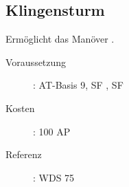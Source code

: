 \subsection{Klingensturm}
\label{sf.klingensturm}
Ermöglicht das Manöver .
\begin{description}
    \item[Voraussetzung]:
        AT-Basis 9, SF , SF 
    \item [Kosten]:
        100 AP
    \item [Referenz]:
        WDS 75
\end{description}
